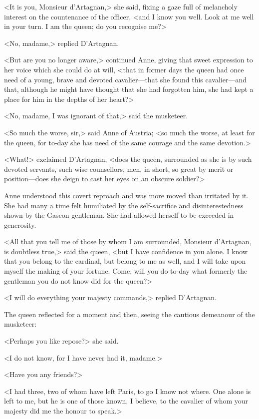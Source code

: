 <It is you, Monsieur d'Artagnan,> she said, fixing a gaze full of melancholy interest on the countenance of the officer, <and I know you well. Look at me well in your turn. I am the queen; do you recognise me?>

<No, madame,> replied D'Artagnan.

<But are you no longer aware,> continued Anne, giving that sweet expression to her voice which she could do at will, <that in former days the queen had once need of a young, brave and devoted cavalier—that she found this cavalier—and that, although he might have thought that she had forgotten him, she had kept a place for him in the depths of her heart?>

<No, madame, I was ignorant of that,> said the musketeer.

<So much the worse, sir,> said Anne of Austria; <so much the worse, at least for the queen, for to-day she has need of the same courage and the same devotion.>

<What!> exclaimed D'Artagnan, <does the queen, surrounded as she is by such devoted servants, such wise counsellors, men, in short, so great by merit or position—does she deign to cast her eyes on an obscure soldier?>

Anne understood this covert reproach and was more moved than irritated by it. She had many a time felt humiliated by the self-sacrifice and disinterestedness shown by the Gascon gentleman. She had allowed herself to be exceeded in generosity.

<All that you tell me of those by whom I am surrounded, Monsieur d'Artagnan, is doubtless true,> said the queen, <but I have confidence in you alone. I know that you belong to the cardinal, but belong to me as well, and I will take upon myself the making of your fortune. Come, will you do to-day what formerly the gentleman you do not know did for the queen?>

<I will do everything your majesty commands,> replied D'Artagnan.

The queen reflected for a moment and then, seeing the cautious demeanour of the musketeer:

<Perhaps you like repose?> she said.

<I do not know, for I have never had it, madame.>

<Have you any friends?>

<I had three, two of whom have left Paris, to go I know not where. One alone is left to me, but he is one of those known, I believe, to the cavalier of whom your majesty did me the honour to speak.>


